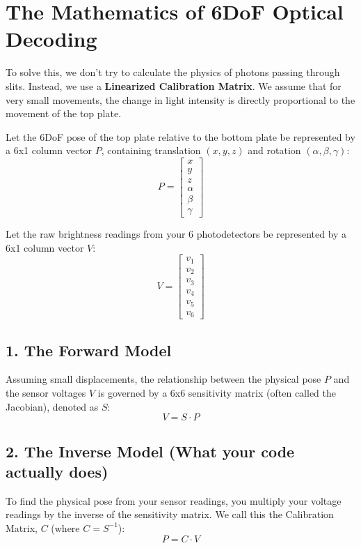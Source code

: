 \documentclass{article}
\begin{document}
\section*{The Mathematics of 6DoF Optical Decoding}

To solve this, we don't try to calculate the physics of photons passing through slits. Instead, we use a \textbf{Linearized Calibration Matrix}. We assume that for very small movements, the change in light intensity is directly proportional to the movement of the top plate.

Let the 6DoF pose of the top plate relative to the bottom plate be represented by a 6x1 column vector $P$, containing translation $(x,y,z)$ and rotation $(\alpha, \beta, \gamma)$:
\begin{equation}
P = \begin{bmatrix} x \\ y \\ z \\ \alpha \\ \beta \\ \gamma \end{bmatrix}
\end{equation}

Let the raw brightness readings from your 6 photodetectors be represented by a 6x1 column vector $V$:
\begin{equation}
V = \begin{bmatrix} v_1 \\ v_2 \\ v_3 \\ v_4 \\ v_5 \\ v_6 \end{bmatrix}
\end{equation}

\subsection*{1. The Forward Model}
Assuming small displacements, the relationship between the physical pose $P$ and the sensor voltages $V$ is governed by a 6x6 sensitivity matrix (often called the Jacobian), denoted as $S$:
\begin{equation}
V = S \cdot P
\end{equation}

\subsection*{2. The Inverse Model (What your code actually does)}
To find the physical pose from your sensor readings, you multiply your voltage readings by the inverse of the sensitivity matrix. We call this the Calibration Matrix, $C$ (where $C = S^{-1}$):
\begin{equation}
P = C \cdot V
\end{equation}
\end{document}
